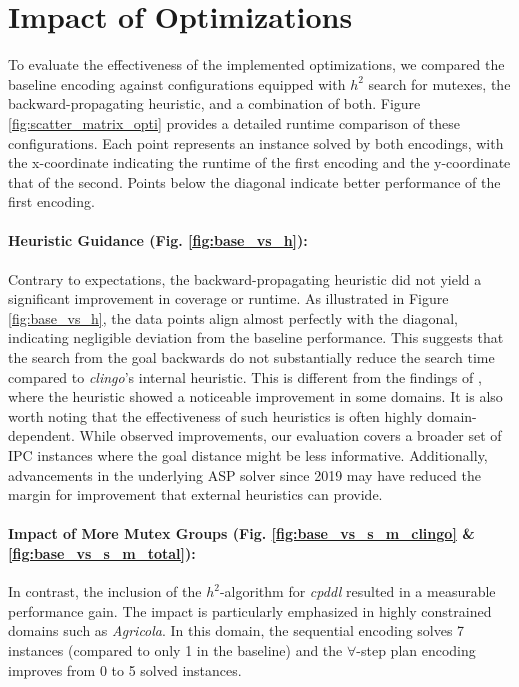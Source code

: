 \documentclass[
     11pt,                    %
     a4paper,             %
     BCOR=10mm,     %
     DIV=14,                 %
     listof=totoc,                    %
     bibliography=totoc,       %
     index=totoc,              %
     parskip            %
     twoside,
     headsepline
     ]{scrreprt}
\theoremstyle{definition}
\theoremstyle{definition}
\theoremstyle{remark}
\theoremstyle{bfnote}
\begin{document}
\section{Impact of Optimizations}
To evaluate the effectiveness of the implemented optimizations, we compared the baseline encoding against configurations equipped with $h^2$ search for mutexes, the backward-propagating heuristic, and a combination of both. Figure \ref{fig:scatter_matrix_opti} provides a detailed runtime comparison of these configurations. Each point represents an instance solved by both encodings, with the x-coordinate indicating the runtime of the first encoding and the y-coordinate that of the second. Points below the diagonal indicate better performance of the first encoding.

\paragraph{Heuristic Guidance (Fig. \ref{fig:base_vs_h}):}
Contrary to expectations, the backward-propagating heuristic did not yield a significant improvement in coverage or runtime. 
As illustrated in Figure \ref{fig:base_vs_h}, the data points align almost perfectly with the diagonal, indicating negligible deviation from the baseline performance. 
This suggests that the search from the goal backwards do not substantially reduce the search time compared to \textit{clingo}'s internal heuristic. This is different from the findings of \textcite{DIMOPOULOS_2019}, where the heuristic showed a noticeable improvement in some domains. It is also worth noting that the effectiveness of such heuristics is often highly domain-dependent. While \textcite{DIMOPOULOS_2019} observed improvements, our evaluation covers a broader set of IPC instances where the goal distance might be less informative. Additionally, advancements in the underlying ASP solver since 2019 may have reduced the margin for improvement that external heuristics can provide.

\paragraph{Impact of More Mutex Groups (Fig. \ref{fig:base_vs_s_m_clingo} \& \ref{fig:base_vs_s_m_total}):}
In contrast, the inclusion of the $h^2$-algorithm for \textit{cpddl} resulted in a measurable performance gain. The impact is particularly emphasized in highly constrained domains such as \textit{Agricola}. In this domain, the sequential encoding solves 7 instances (compared to only 1 in the baseline) and the $\forall$-step plan encoding improves from 0 to 5 solved instances.
\end{document}
